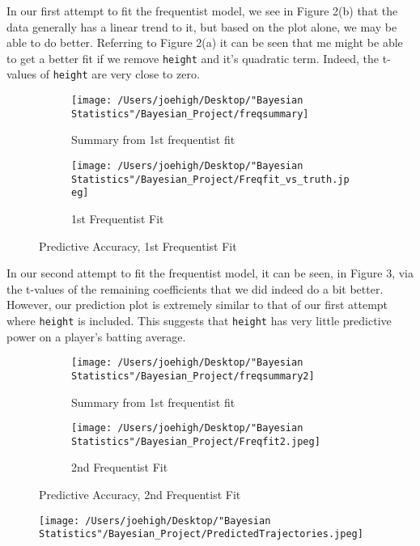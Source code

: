 \documentclass[10pt,a4paper]{article}
\begin{document}
In our first attempt to fit the frequentist model, we see in Figure 2(b) that the data generally has a linear trend to it, but based on the plot alone, we may be able to do better. Referring to Figure 2(a) it can be seen that me might be able to get a better fit if we remove \texttt{height} and it's quadratic term. Indeed, the t-values of \texttt{height} are very close to zero.
\begin{figure}[H]
\begin{subfigure}{0.5\textwidth}
\texttt{[image: /Users/joehigh/Desktop/"Bayesian Statistics"/Bayesian\_Project/freqsummary]}
\caption{Summary from 1st frequentist fit}
\label{fig:subim2}
\end{subfigure}
\begin{subfigure}{0.5\textwidth}
\texttt{[image: /Users/joehigh/Desktop/"Bayesian Statistics"/Bayesian\_Project/Freqfit\_vs\_truth.jpeg]}
\caption{1st Frequentist Fit}
\label{fig:subim1}
\end{subfigure}

\caption{Predictive Accuracy, 1st Frequentist Fit}
\end{figure}

In our second attempt to fit the frequentist model, it can be seen, in Figure 3, via the t-values of the remaining coefficients that we did indeed do a bit better. However, our prediction plot is extremely similar to that of our first attempt where \texttt{height} is included. This suggests that \texttt{height} has very little predictive power on a player's batting average.
\begin{figure}[H]
\begin{subfigure}{0.5\textwidth}
\texttt{[image: /Users/joehigh/Desktop/"Bayesian Statistics"/Bayesian\_Project/freqsummary2]}
\caption{Summary from 1st frequentist fit}
\label{fig:subim2}
\end{subfigure}
\begin{subfigure}{0.5\textwidth}
\texttt{[image: /Users/joehigh/Desktop/"Bayesian Statistics"/Bayesian\_Project/Freqfit2.jpeg]}
\caption{2nd Frequentist Fit}
\label{fig:subim1}
\end{subfigure}

\caption{Predictive Accuracy, 2nd Frequentist Fit}
\end{figure}


\begin{figure}[H]
\begin{center}
\texttt{[image: /Users/joehigh/Desktop/"Bayesian Statistics"/Bayesian\_Project/PredictedTrajectories.jpeg]}
\caption{}
\label{fig}
\end{center}
\end{figure}
\end{document}
